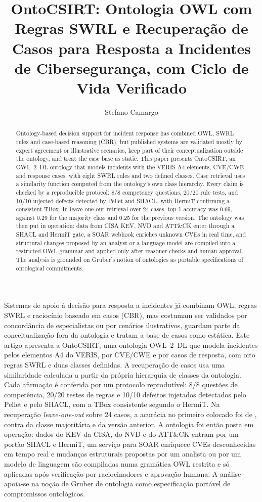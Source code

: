 \documentclass[12pt]{article}
\title{OntoCSIRT: Ontologia OWL com Regras SWRL e Recuperação de Casos para Resposta a Incidentes de Cibersegurança, com Ciclo de Vida Verificado}
\author{Stefano Camargo\inst{1}}
\begin{document}
\maketitle

\begin{abstract}
Ontology-based decision support for incident response has combined OWL, SWRL rules and case-based reasoning (CBR), but published systems are validated mostly by expert agreement or illustrative scenarios, keep part of their conceptualization outside the ontology, and treat the case base as static. This paper presents OntoCSIRT, an OWL~2~DL ontology that models incidents with the VERIS A4 elements, CVE/CWE and response cases, with eight SWRL rules and two defined classes. Case retrieval uses a similarity function computed from the ontology's own class hierarchy. Every claim is checked by a reproducible protocol: 8/8 competency questions, 20/20 rule tests, and 10/10 injected defects detected by Pellet and SHACL, with HermiT confirming a consistent TBox. In leave-one-out retrieval over 24 cases, top-1 accuracy was 0.69, against 0.29 for the majority class and 0.25 for the previous version. The ontology was then put in operation: data from CISA KEV, NVD and ATT\&CK enter through a SHACL and HermiT gate, a SOAR webhook enriches unknown CVEs in real time, and structural changes proposed by an analyst or a language model are compiled into a restricted OWL grammar and applied only after reasoner checks and human approval. The analysis is grounded on Gruber's notion of ontologies as portable specifications of ontological commitments.
\end{abstract}

\begin{resumo}
Sistemas de apoio à decisão para resposta a incidentes já combinam OWL, regras SWRL e raciocínio baseado em casos (CBR), mas costumam ser validados por concordância de especialistas ou por cenários ilustrativos, guardam parte da conceitualização fora da ontologia e tratam a base de casos como estática. Este artigo apresenta a OntoCSIRT, uma ontologia OWL~2~DL que modela incidentes pelos elementos A4 do VERIS, por CVE/CWE e por casos de resposta, com oito regras SWRL e duas classes definidas. A recuperação de casos usa uma similaridade calculada a partir da própria hierarquia de classes da ontologia. Cada afirmação é conferida por um protocolo reprodutível: 8/8 questões de competência, 20/20 testes de regras e 10/10 defeitos injetados detectados pelo Pellet e pelo SHACL, com a TBox consistente segundo o HermiT. Na recuperação \emph{leave-one-out} sobre 24 casos, a acurácia no primeiro colocado foi de \accVseven{}, contra \accMaj{} da classe majoritária e \accVsix{} da versão anterior. A ontologia foi então posta em operação: dados do KEV da CISA, do NVD e do ATT\&CK entram por um portão SHACL e HermiT, um serviço para SOAR enriquece CVEs desconhecidas em tempo real e mudanças estruturais propostas por um analista ou por um modelo de linguagem são compiladas numa gramática OWL restrita e só aplicadas após verificação por raciocinadores e aprovação humana. A análise apoia-se na noção de Gruber de ontologia como especificação portável de compromissos ontológicos.
\end{resumo}
\end{document}
